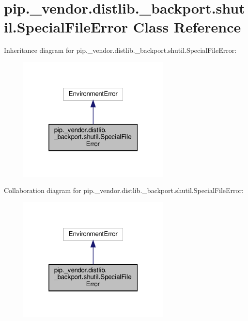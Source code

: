 \hypertarget{classpip_1_1__vendor_1_1distlib_1_1__backport_1_1shutil_1_1SpecialFileError}{}\section{pip.\+\_\+vendor.\+distlib.\+\_\+backport.\+shutil.\+Special\+File\+Error Class Reference}
\label{classpip_1_1__vendor_1_1distlib_1_1__backport_1_1shutil_1_1SpecialFileError}


Inheritance diagram for pip.\+\_\+vendor.\+distlib.\+\_\+backport.\+shutil.\+Special\+File\+Error\+:
\nopagebreak
\begin{figure}[H]
\begin{center}
\leavevmode
\includegraphics[width=217pt]{classpip_1_1__vendor_1_1distlib_1_1__backport_1_1shutil_1_1SpecialFileError__inherit__graph}
\end{center}
\end{figure}


Collaboration diagram for pip.\+\_\+vendor.\+distlib.\+\_\+backport.\+shutil.\+Special\+File\+Error\+:
\nopagebreak
\begin{figure}[H]
\begin{center}
\leavevmode
\includegraphics[width=217pt]{classpip_1_1__vendor_1_1distlib_1_1__backport_1_1shutil_1_1SpecialFileError__coll__graph}
\end{center}
\end{figure}


